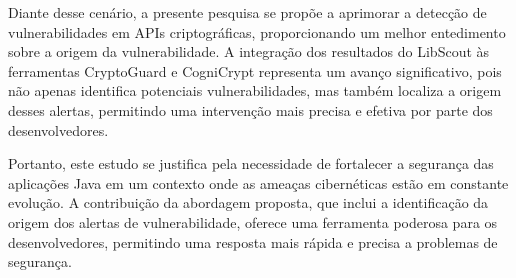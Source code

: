 Diante desse cenário, a presente pesquisa se propõe a aprimorar a detecção de vulnerabilidades em APIs criptográficas, proporcionando um melhor entedimento sobre a origem da vulnerabilidade. A integração dos resultados do LibScout às ferramentas CryptoGuard e CogniCrypt representa um avanço significativo, pois não apenas identifica potenciais vulnerabilidades, mas também localiza a origem desses alertas, permitindo uma intervenção mais precisa e efetiva por parte dos desenvolvedores.

Portanto, este estudo se justifica pela necessidade de fortalecer a segurança das aplicações Java em um contexto onde as ameaças cibernéticas estão em constante evolução. A contribuição da abordagem proposta, que inclui a identificação da origem dos alertas de vulnerabilidade, oferece uma ferramenta poderosa para os desenvolvedores, permitindo uma resposta mais rápida e precisa a problemas de segurança.
